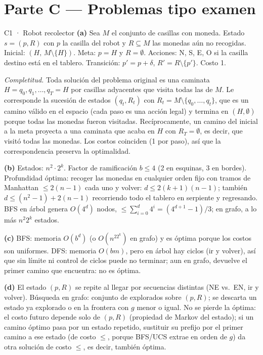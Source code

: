 \newpage
\section{Parte C — Problemas tipo examen}

\begin{solucion}{C1 · Robot recolector}
\textbf{(a)} Sea $M$ el conjunto de casillas con moneda. Estado $s=(p,R)$ con $p$ la casilla del robot y
$R\subseteq M$ las monedas aún no recogidas. Inicial: $(H,\,M\setminus\{H\})$. Meta: $p=H$ y $R=\emptyset$.
Acciones: N, S, E, O si la casilla destino está en el tablero. Transición: $p'=p+\delta$,
$R'=R\setminus\{p'\}$. Costo 1.

\emph{Completitud.} Toda solución del problema original es una caminata $H=q_0,q_1,\dots,q_T=H$ por
casillas adyacentes que visita todas las de $M$. Le corresponde la sucesión de estados
$(q_t,R_t)$ con $R_t=M\setminus\{q_0,\dots,q_t\}$, que es un camino válido en el espacio (cada paso es
una acción legal) y termina en $(H,\emptyset)$ porque todas las monedas fueron visitadas. Recíprocamente,
un camino del inicial a la meta proyecta a una caminata que acaba en $H$ con $R_T=\emptyset$, es decir,
que visitó todas las monedas. Los costos coinciden (1 por paso), así que la correspondencia preserva la
optimalidad.

\textbf{(b)} Estados: $n^2\cdot2^k$. Factor de ramificación $b\le4$ (2 en esquinas, 3 en bordes).
Profundidad óptima: recoger las monedas en cualquier orden fijo con tramos de Manhattan
$\le2(n-1)$ cada uno y volver: $d\le 2(k+1)(n-1)$; también $d\le (n^2-1)+2(n-1)$ recorriendo todo el
tablero en serpiente y regresando. BFS en árbol genera $O(4^{d})$ nodos, $\le \sum_{i=0}^{d}4^i=(4^{d+1}-1)/3$;
en grafo, a lo más $n^2 2^k$ estados.

\textbf{(c)} BFS: memoria $O(b^d)$ (o $O(n^22^k)$ en grafo) y es óptima porque los costos son
uniformes. DFS: memoria $O(bm)$, pero en árbol hay ciclos (ir y volver), así que sin límite ni control de
ciclos puede no terminar; aun en grafo, devuelve el primer camino que encuentra: no es óptima.

\textbf{(d)} El estado $(p,R)$ se repite al llegar por secuencias distintas (NE vs.\ EN, ir y volver).
Búsqueda en grafo: conjunto de explorados sobre $(p,R)$; se descarta un estado ya explorado o en la
frontera con $g$ menor o igual. No se pierde la óptima: el costo futuro depende solo de $(p,R)$
(propiedad de Markov del estado); si un camino óptimo pasa por un estado repetido, sustituir su
prefijo por el primer camino a ese estado (de costo $\le$, porque BFS/UCS extrae en orden de $g$) da
otra solución de costo $\le$, es decir, también óptima.


\end{solucion}
